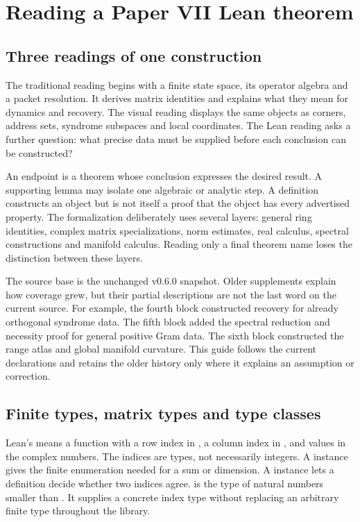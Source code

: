 \section{Reading a Paper VII Lean theorem}
\label{sec:reading}

\subsection{Three readings of one construction}
The traditional reading begins with a finite state space, its operator algebra and a packet resolution. It derives matrix identities and explains what they mean for dynamics and recovery. The visual reading displays the same objects as corners, address sets, syndrome subspaces and local coordinates. The Lean reading asks a further question: what precise data must be supplied before each conclusion can be constructed?

An endpoint is a theorem whose conclusion expresses the desired result. A supporting lemma may isolate one algebraic or analytic step. A definition constructs an object but is not itself a proof that the object has every advertised property. The formalization deliberately uses several layers: general ring identities, complex matrix specializations, norm estimates, real calculus, spectral constructions and manifold calculus. Reading only a final theorem name loses the distinction between these layers.

The source base is the unchanged v0.6.0 snapshot. Older supplements explain how coverage grew, but their partial descriptions are not the last word on the current source. For example, the fourth block constructed recovery for already orthogonal syndrome data. The fifth block added the spectral reduction and necessity proof for general positive Gram data. The sixth block constructed the range atlas and global manifold curvature. This guide follows the current declarations and retains the older history only where it explains an assumption or correction.

\subsection{Finite types, matrix types and type classes}
Lean's  means a function with a row index in , a column index in , and values in the complex numbers. The indices are types, not necessarily integers. A  instance gives the finite enumeration needed for a sum or dimension. A  instance lets a definition decide whether two indices agree.  is the type of natural numbers smaller than . It supplies a concrete index type without replacing an arbitrary finite type throughout the library.

